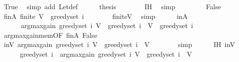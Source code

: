 \begin{isabellebody}
\ True\ \isamarkupfalse%
\ {\isacharparenleft}{\kern0pt}simp\ add{\isacharcolon}{\kern0pt}\ Let{\isacharunderscore}{\kern0pt}def{\isacharparenright}{\kern0pt}\isanewline
\ \ \ \ \isamarkupfalse%
\ {\isacharquery}{\kern0pt}thesis\isanewline
\ \ \ \ \ \ \isamarkupfalse%
\ IH\ \isamarkupfalse%
\ simp\isanewline
\isanewline
\ \ \isamarkupfalse%
\isanewline
\ \ \ \ \isamarkupfalse%
\ False\isanewline
\ \ \ \ \isamarkupfalse%
\ finA{\isacharcolon}{\kern0pt}\ {\isachardoublequoteopen}finite\ {\isacharparenleft}{\kern0pt}V\ {\isacharminus}{\kern0pt}\ greedy{\isacharunderscore}{\kern0pt}set\ i{\isacharparenright}{\kern0pt}{\isachardoublequoteclose}\isanewline
\ \ \ \ \ \ \isamarkupfalse%
\ finite{\isacharunderscore}{\kern0pt}V\ \isamarkupfalse%
\ simp\isanewline
\ \ \ \ \isamarkupfalse%
\ inA{\isacharcolon}{\kern0pt}\isanewline
\ \ \ \ \ \ {\isachardoublequoteopen}argmax{\isacharunderscore}{\kern0pt}gain\ {\isacharparenleft}{\kern0pt}greedy{\isacharunderscore}{\kern0pt}set\ i{\isacharparenright}{\kern0pt}\ {\isacharparenleft}{\kern0pt}V\ {\isacharminus}{\kern0pt}\ greedy{\isacharunderscore}{\kern0pt}set\ i{\isacharparenright}{\kern0pt}\ {\isasymin}\ V\ {\isacharminus}{\kern0pt}\ greedy{\isacharunderscore}{\kern0pt}set\ i{\isachardoublequoteclose}\isanewline
\ \ \ \ \ \ \isamarkupfalse%
\ argmax{\isacharunderscore}{\kern0pt}gain{\isacharunderscore}{\kern0pt}mem{\isacharbrackleft}{\kern0pt}OF\ finA\ False{\isacharbrackright}{\kern0pt}\ \isakeywordONE{{\isachardot}{\kern0pt}}\isamarkupfalse%
\isanewline
\isanewline
\ \ \ \ \isamarkupfalse%
\ inV{\isacharcolon}{\kern0pt}\ {\isachardoublequoteopen}argmax{\isacharunderscore}{\kern0pt}gain\ {\isacharparenleft}{\kern0pt}greedy{\isacharunderscore}{\kern0pt}set\ i{\isacharparenright}{\kern0pt}\ {\isacharparenleft}{\kern0pt}V\ {\isacharminus}{\kern0pt}\ greedy{\isacharunderscore}{\kern0pt}set\ i{\isacharparenright}{\kern0pt}\ {\isasymin}\ V{\isachardoublequoteclose}\isanewline
\ \ \ \ \ \ \isamarkupfalse%
\ simp\isanewline
\isanewline
\ \ \ \ \isamarkupfalse%
\ IH\ inV\isanewline
\ \ \ \ \isamarkupfalse%
\ {\isachardoublequoteopen}greedy{\isacharunderscore}{\kern0pt}set\ i\ {\isasymunion}\ {\isacharbraceleft}{\kern0pt}argmax{\isacharunderscore}{\kern0pt}gain\ {\isacharparenleft}{\kern0pt}greedy{\isacharunderscore}{\kern0pt}set\ i{\isacharparenright}{\kern0pt}\ {\isacharparenleft}{\kern0pt}V\ {\isacharminus}{\kern0pt}\ greedy{\isacharunderscore}{\kern0pt}set\ i{\isacharparenright}{\kern0pt}{\isacharbraceright}{\kern0pt}\ {\isasymsubseteq}\ V{\isachardoublequoteclose}\isanewline

\end{isabellebody}
